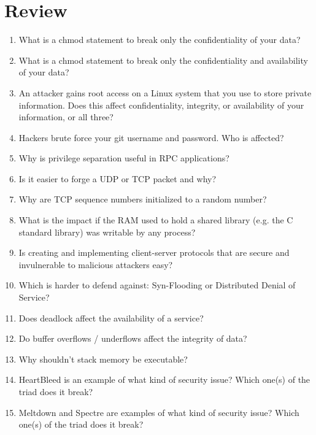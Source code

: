 \section{Review}

\begin{enumerate}
\item What is a chmod statement to break only the confidentiality of your data?

\item What is a chmod statement to break only the confidentiality and availability of your data?

\item An attacker gains root access on a Linux system that you use to store private information. Does this affect confidentiality, integrity, or availability of your information, or all three?

\item Hackers brute force your git username and password. Who is affected?

\item Why is privilege separation useful in RPC applications?

\item Is it easier to forge a UDP or TCP packet and why? 

\item Why are TCP sequence numbers initialized to a random number?

\item What is the impact if the RAM used to hold a shared library (e.g. the C standard library) was writable by any process?

\item Is creating and implementing client-server protocols that are secure and invulnerable to malicious attackers easy?

\item Which is harder to defend against: Syn-Flooding or Distributed Denial of Service?

\item Does deadlock affect the availability of a service?

\item Do buffer overflows / underflows affect the integrity of data?

\item Why shouldn't stack memory be executable?

\item HeartBleed is an example of what kind of security issue? Which one(s) of the triad does it break?

\item Meltdown and Spectre are examples of what kind of security issue? Which one(s) of the triad does it break?

\end{enumerate}



